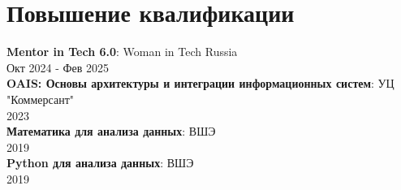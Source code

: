 \documentclass[letterpaper,11pt,english,russian]{article}
\begin{document}
\section{Повышение квалификации}
 \begin{itemize}[leftmargin=0.15in, label={}]
    \small{\item{
     \textbf{Mentor in Tech 6.0}{: Woman in Tech Russia\\ Окт 2024 - Фев 2025} \\
     \textbf{OAIS: Основы архитектуры и интеграции информационных систем}{: УЦ "Коммерсант"\\ 2023} \\
     \textbf{Математика для анализа данных}{: ВШЭ\\ 2019} \\
     \textbf{Python для анализа данных}{: ВШЭ\\ 2019}
    }}
 \end{itemize}


\end{document}
